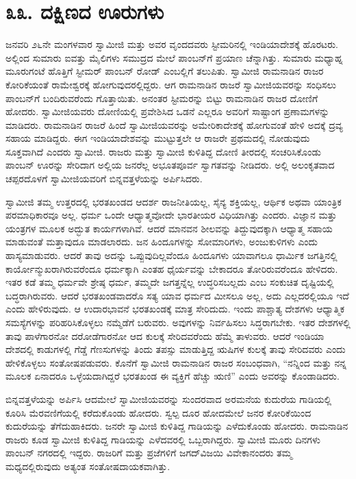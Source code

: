 
\chapter*{೩೩. ದಕ್ಷಿಣದ ಊರುಗಳು}

 ಜನವರಿ ೨೬ನೇ ಮಂಗಳವಾರ ಸ್ವಾಮೀಜಿ ಮತ್ತು ಅವರ ವೃಂದದವರು ಸ್ಟೀಮರಿನಲ್ಲಿ ಇಂಡಿಯಾದೇಶಕ್ಕೆ ಹೊರಟರು. ಅಲ್ಲಿಂದ ಸುಮಾರು ಐವತ್ತು ಮೈಲಿಗಳು ಸಮುದ್ರದ ಮೇಲೆ ಪಾಂಬನ್‌ಗೆ ಪ್ರಯಾಣ ಚೆನ್ನಾಗಿತ್ತು. ಸುಮಾರು ಮಧ್ಯಾಹ್ನ ಮೂರುಗಂಟೆ ಹೊತ್ತಿಗೆ ಸ್ಟೀಮರ್ ಪಾಂಬನ್ ರೋಡ್ ಎಂಬಲ್ಲಿಗೆ ತಲುಪಿತು. ಸ್ವಾಮೀಜಿ ರಾಮನಾಡಿನ ರಾಜರ ಕೋರಿಕೆಯಂತೆ ರಾಮೇಶ್ವರಕ್ಕೆ ಹೋಗುವುದರಲ್ಲಿದ್ದರು. ಆಗ ರಾಮನಾಡಿನ ರಾಜರೆ ಸ್ವಾಮೀಜಿಯವರನ್ನು ಸಂಧಿಸಲು ಪಾಂಬನ್‌ಗೆ ಬಂದಿರುವರೆಂದು ಗೊತ್ತಾಯಿತು. ಅನಂತರ ಸ್ಟೀಮರನ್ನು ಬಿಟ್ಟು ರಾಮನಾಡಿನ ರಾಜರ ದೋಣಿಗೆ ಹೋದರು. ಸ್ವಾಮೀಜಿಯವರು ದೋಣಿಯಲ್ಲಿ ಪ್ರವೇಶಿಸಿದ ಒಡನೆ ಎಲ್ಲರೂ ಅವರಿಗೆ ಸಾಷ್ಟಾಂಗ ಪ್ರಣಾಮಗಳನ್ನು ಮಾಡಿದರು. ರಾಮನಾಡಿನ ರಾಜರೆ ಹಿಂದೆ ಸ್ವಾಮೀಜಿಯವರನ್ನು ಅಮೇರಿಕಾದೇಶಕ್ಕೆ ಹೋಗುವಂತೆ ಹೇಳಿ ಅದಕ್ಕೆ ದ್ರವ್ಯ ಸಹಾಯ ಮಾಡಿದ್ದರು. ಈಗ ಇಂಡಿಯಾದೇಶವನ್ನು ಮುಟ್ಟುತ್ತಲೇ ಆ ರಾಜರೇ ಪ್ರಥಮದಲ್ಲಿ ನೋಡುವುದು ಸೂಕ್ತವಾಗಿದೆ ಎಂದರು ಸ್ವಾಮೀಜಿ. ರಾಜರು ಮತ್ತು ಸ್ವಾಮೀಜಿ ಕುಳಿತಿದ್ದ ದೋಣಿ ತೀರದಲ್ಲಿ ಸಂಚರಿಸಿಕೊಂಡು ಪಾಂಬನ್ ಊರನ್ನು ಸೇರಿದಾಗ ಅಲ್ಲಿಯ ಜನರೆಲ್ಲ ಅಭೂತಪೂರ್ವ ಸ್ವಾಗತವನ್ನು ನೀಡಿದರು. ಅಲ್ಲಿ ಅಲಂಕೃತವಾದ ಚಪ್ಪರದೊಳಗೆ ಸ್ವಾಮೀಜಿಯವರಿಗೆ ಬಿನ್ನವತ್ತಳೆಯನ್ನು ಅರ್ಪಿಸಿದರು. 

 ಸ್ವಾಮೀಜಿ ತಮ್ಮ ಉತ್ತರದಲ್ಲಿ ಭರತಖಂಡದ ಆದರ್ಶ ರಾಜನೀತಿಯಲ್ಲ, ಸೈನ್ಯ ಶಕ್ತಿಯಲ್ಲ, ಆರ್ಥಿಕ ಅಥವಾ ಯಾಂತ್ರಿಕ ಪರಮಾಧಿಕಾರವೂ ಅಲ್ಲ. ಧರ್ಮ ಒಂದೇ ಆಧ್ಯಾತ್ಮವೋದೇ ಭಾರತೀಯರ ವಿಧಿಯಾಗಿತ್ತು ಎಂದರು. ವಿಜ್ಞಾನ ಮತ್ತು ಯಂತ್ರಗಳ ಮೂಲಕ ಅದ್ಭುತ ಕಾರ್ಯಗಳಾಗಿವೆ. ಆದರೆ ಮಾನವನ ಶೀಲವನ್ನು ತಿದ್ದುವುದಕ್ಕಾಗಿ ಆಧ್ಯಾತ್ಮ ಸಹಾಯ ಮಾಡುವಂತೆ ಮತ್ತಾವುದೂ ಮಾಡಲಾರದು. ಜನ ಹಿಂದೂಗಳನ್ನು ಸೋಮಾರಿಗಳು, ಅಂಜುಕುಳಿಗಳು ಎಂದು ಹಾಸ್ಯಮಾಡುವರು. ಆದರೆ ತಾವು ಅದನ್ನು ಒಪ್ಪುವುದಿಲ್ಲವೆಂದೂ ಹಿಂದೂಗಳು ಯಾವಾಗಲೂ ಧಾರ್ಮಿಕ ಜಗತ್ತಿನಲ್ಲಿ ಕಾರ್ಯೋನ್ಮುಖರಾಗಿರುವರೆಂದೂ ಧರ್ಮಕ್ಕಾಗಿ ಎಂತಹ ಧೈರ್ಯವನ್ನು ಬೇಕಾದರೂ ತೋರಿರುವರೆಂದೂ ಹೇಳಿದರು. ಇತರ ಕಡೆ ತಮ್ಮ ಧರ್ಮವೇ ಶ್ರೇಷ್ಠ ಧರ್ಮ, ತಮ್ಮದೇ ಜಗತ್ತನ್ನೆಲ್ಲ ಉದ್ಧರಿಸಬಲ್ಲದು ಎಂಬ ಸಂಕುಚಿತ ದೃಷ್ಟಿಯಲ್ಲಿ ಬದ್ಧರಾಗಿರುವರು. ಆದರೆ ಭರತಖಂಡವಾದರೊ ಸತ್ಯ ಯಾವ ಧರ್ಮದ ಮೀಸಲೂ ಅಲ್ಲ, ಅದು ಎಲ್ಲದರಲ್ಲಿಯೂ ಇದೆ ಎಂದು ಹೇಳಿರುವುದು. ಆ ಉದಾರಭಾವನೆ ಭರತಖಂಡಕ್ಕೆ ಮಾತ್ರ ಸೇರಿದುದು. ಇಂದು ಪಾಶ್ಚಾತ್ಯ ದೇಶಗಳು ಆಧ್ಯಾತ್ಮಿಕ ಸಮಸ್ಯೆಗಳನ್ನು ಪರಿಹರಿಸಿಕೊಳ್ಳಲು ನಮ್ಮೆಡೆಗೆ ಬರುವರು. ಅವುಗಳನ್ನು ನಿರ್ವಹಿಸಲು ಸಿದ್ಧರಾಗಬೇಕು. ಇತರ ದೇಶಗಳಲ್ಲಿ ತಾವು ಪಾಳೆಗಾರನೋ ದರೋಡೆಗಾರನೋ ಆದ ಕುಲಕ್ಕೆ ಸೇರಿದವರೆಂದು ಹೆಮ್ಮೆ ತಾಳುವರು. ಆದರೆ ಇಂಡಿಯಾ ದೇಶದಲ್ಲಿ ಕಾಡುಗಳಲ್ಲಿ ಗೆಡ್ಡೆ ಗೆಣಸುಗಳನ್ನು ತಿಂದು ತಪಸ್ಸು ಮಾಡುತ್ತಿದ್ದ ಋಷಿಗಳ ಕುಲಕ್ಕೆ ತಾವು ಸೇರಿದವರು ಎಂದು ಹೇಳಿಕೊಳ್ಳಲು ಸಂತೋಷಪಡುವರು. ಕೊನೆಗೆ ಸ್ವಾಮೀಜಿ ರಾಮನಾಡಿನ ರಾಜರ ಸಂಬಂಧವಾಗಿ, “ನನ್ನಿಂದ ಮತ್ತು ನನ್ನ ಮೂಲಕ ಏನಾದರೂ ಒಳ್ಳೆಯದಾಗಿದ್ದರೆ ಭರತಖಂಡ ಈ ವ್ಯಕ್ತಿಗೆ ಹೆಚ್ಚು ಋಣಿ” ಎಂದು ಅವರನ್ನು ಕೊಂಡಾಡಿದರು. 

 ಬಿನ್ನವತ್ತಳೆಯನ್ನು ಅರ್ಪಿಸಿ ಆದಮೇಲೆ ಸ್ವಾಮೀಜಿಯವರನ್ನು ಸುಂದರವಾದ ಅರಮನೆಯ ಕುದುರೆಯ ಗಾಡಿಯಲ್ಲಿ ಕೂರಿಸಿ ಮೆರವಣಿಗೆಯಲ್ಲಿ ಕರೆದುಕೊಂಡು ಹೋದರು. ಸ್ವಲ್ಪ ದೂರ ಹೋದಮೇಲೆ ಜನರ ಕೋರಿಕೆಯಿಂದ ಕುದುರೆಯನ್ನು ತೆಗೆದುಹಾಕಿದರು. ಜನರೇ ಸ್ವಾಮೀಜಿ ಕುಳಿತಿದ್ದ ಗಾಡಿಯನ್ನು ಎಳೆದುಕೊಂಡು ಹೋದರು. ರಾಮನಾಡಿನ ರಾಜರು ಕೂಡ ಸ್ವಾಮೀಜಿ ಕುಳಿತಿದ್ದ ಗಾಡಿಯನ್ನು ಎಳೆದವರಲ್ಲಿ ಒಬ್ಬರಾಗಿದ್ದರು. ಸ್ವಾಮೀಜಿ ಮೂರು ದಿನಗಳು ಪಾಂಬನ್ ನಗರದಲ್ಲಿ ಇದ್ದರು. ರಾಜರಿಗೆ ಮತ್ತು ಪ್ರಜೆಗಳಿಗೆ ಜಗದ್‌ವಿಜಯಿ ವಿವೇಕಾನಂದರು ತಮ್ಮ ಮಧ್ಯದಲ್ಲಿರುವುದು ಅತ್ಯಂತ ಸಂತೋಷದಾಯಕವಾಗಿತ್ತು. 

